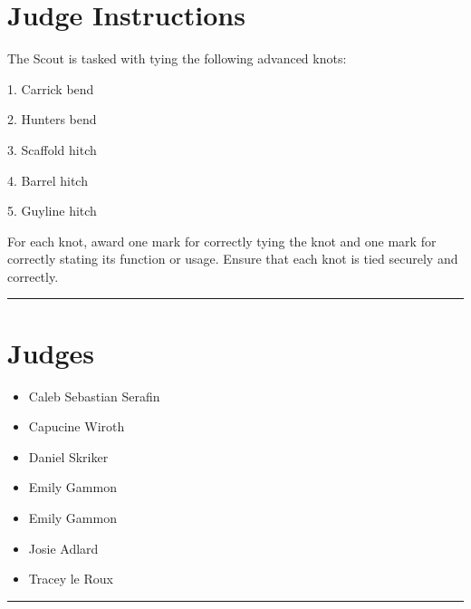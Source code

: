 \documentclass[10pt]{article}
\begin{document}
		\section*{Judge Instructions}
		The Scout is tasked with tying the following advanced knots:

1. Carrick bend

2. Hunters bend

3. Scaffold hitch

4. Barrel hitch

5. Guyline hitch



For each knot, award one mark for correctly tying the knot and one mark for correctly stating its function or usage. Ensure that each knot is tied securely and correctly.


\vspace{0.5cm}
	\hrule
	\vspace{0.5cm}
		\section*{\faUsers \: Judges}

		

	\begin{multicols}{2}

		\begin{itemize}
									\item Caleb Sebastian Serafin
									\item Capucine Wiroth
									\item Daniel Skriker
									\item Emily Gammon
						\end{itemize}

		\vfill\null
		\columnbreak

		\begin{itemize}
									\item Emily Gammon
									\item Josie Adlard
									\item Tracey le Roux
						\end{itemize}

		\vfill\null

		\end{multicols}



			\vspace{0.5cm}
	\hrule
	\vspace{0.5cm}
\end{document}
